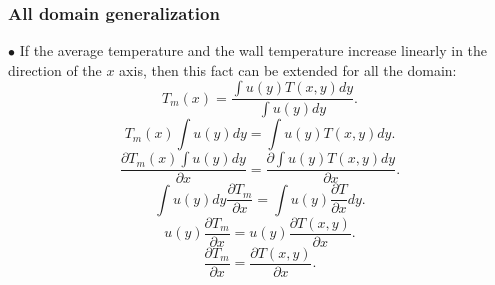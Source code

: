 \documentclass[xcolor=dvipsnames,8pt,aspectratio=34]{beamer}
\begin{document}
	
	
	
		
		\begin{frame}
		\frametitle{All domain generalization}
		$\bullet$ If the average temperature and the wall temperature increase linearly in the direction of the $ x $ axis, then this fact can be extended for all the domain:
		\begin{equation}
		T_m(x) = \frac{\int u(y) T(x , y) dy}{\int u(y)  dy} .
		\end{equation}
		\begin{equation}
		T_m(x) \int u(y)dy = \int u(y) T(x , y) dy .
		\end{equation}
		\begin{equation}
		\frac{\partial T_m(x) \int u(y)dy}{\partial x} = \frac{ \partial \int u(y) T(x , y) dy}{
		\partial x} .
		\end{equation}
		\begin{equation}
		 \int u(y)dy \frac{\partial T_m}{\partial x} = \int u(y)  \frac{\partial T}{
			\partial x}  dy.
		\end{equation}
		\begin{equation}
		u(y) \frac{\partial T_m}{\partial x} = u(y)  \frac{\partial T(x , y)}{
			\partial x}.
		\end{equation}
		\begin{equation}
		\frac{\partial T_m}{\partial x} = \frac{\partial T(x , y)}{
			\partial x}.
		\end{equation}		
		
		\end{frame}
		
\end{document}
